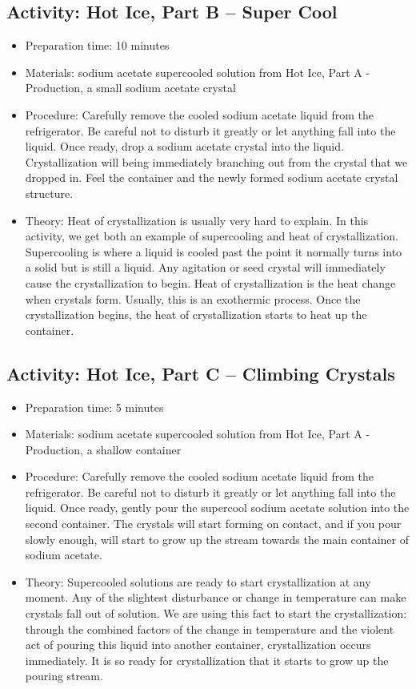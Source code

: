\begin{itemize}
{\begin{itemize}
\subsection{Activity: Hot Ice, Part B – Super Cool}
\begin{itemize}
\item{Preparation time: 10 minutes}
\item{Materials: sodium acetate supercooled solution from Hot Ice, Part A - Production, a small sodium acetate crystal}
\item{Procedure: Carefully remove the cooled sodium acetate liquid from the refrigerator. Be careful not to disturb it greatly or let anything fall into the liquid. Once ready, drop a sodium acetate crystal into the liquid. Crystallization will being immediately branching out from the crystal that we dropped in. Feel the container and the newly formed sodium acetate crystal structure.}
\item{Theory: Heat of crystallization is usually very hard to explain. In this activity, we get both an example of supercooling and heat of crystallization. Supercooling is where a liquid is cooled past the point it normally turns into a solid but is still a liquid. Any agitation or seed crystal will immediately cause the crystallization to begin. Heat of crystallization is the heat change when crystals form. Usually, this is an exothermic process. Once the crystallization begins, the heat of crystallization starts to heat up the container.}
\end{itemize}

\subsection{Activity: Hot Ice, Part C – Climbing Crystals}
\begin{itemize}
\item{Preparation time: 5 minutes}
\item{Materials: sodium acetate supercooled solution from Hot Ice, Part A - Production, a shallow container}
\item{Procedure: Carefully remove the cooled sodium acetate liquid from the refrigerator. Be careful not to disturb it greatly or let anything fall into the liquid. Once ready, gently pour the supercool sodium acetate solution into the second container. The crystals will start forming on contact, and if you pour slowly enough, will start to grow up the stream towards the main container of sodium acetate.}
\item{Theory: Supercooled solutions are ready to start crystallization at any moment. Any of the slightest disturbance or change in temperature can make crystals fall out of solution. We are using this fact to start the crystallization: through the combined factors of the change in temperature and the violent act of pouring this liquid into another container, crystallization occurs immediately. It is so ready for crystallization that it starts to grow up the pouring stream.}
\end{itemize}


\end{itemize}}
\end{itemize}
